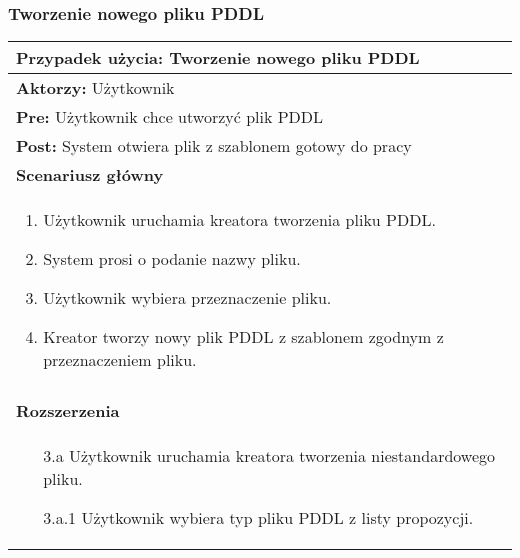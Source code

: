\subsubsection{Tworzenie nowego pliku PDDL}
\label{reqAutocompletion}
\begin{table}[H]
\centering
\begin{tabular}{|p{\textwidth}|}
\hline 
\textbf{Przypadek użycia:} Tworzenie nowego pliku PDDL\\
\hline
\textbf{Aktorzy:} Użytkownik\\
\hline
\textbf{Pre:} Użytkownik chce utworzyć plik PDDL\\
\hline
\textbf{Post:} System otwiera plik z szablonem gotowy do pracy\\
\hline
\textbf{Scenariusz główny}\\
\hline
\begin{enumerate}
\item Użytkownik uruchamia kreatora tworzenia pliku PDDL.
\item System prosi o podanie nazwy pliku.
\item Użytkownik wybiera przeznaczenie pliku.
\item Kreator tworzy nowy plik PDDL z szablonem zgodnym z przeznaczeniem pliku.
\end{enumerate}\\
\hline
\\\textbf{Rozszerzenia}\\
\hline
\begin{enumerate}
\item[3.a] Użytkownik uruchamia kreatora tworzenia niestandardowego pliku.
\item[3.a.1] Użytkownik wybiera typ pliku PDDL z listy propozycji.
\end{enumerate}\\
\hline
\end{tabular}
\end{table}
